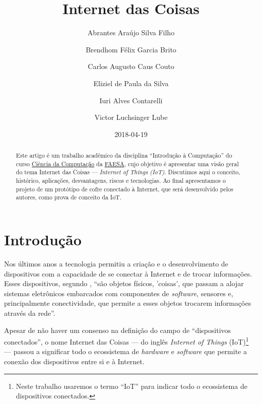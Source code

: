 \documentclass[pdftex, brazil, 12pt, twoside]{article}
\newcommand{\ingles}[1]{\textit{#1}}
\begin{document}
\title{Internet das Coisas}
\author{Abrantes Araújo Silva Filho \and Brendhom Félix Garcia Brito
  \and Carlos Augusto Caus Couto \and Eliziel de Paula da Silva \and Iuri Alves Contarelli
  \and Victor Luchsinger Lube}
\date{2018-04-19}
\maketitle
\begin{abstract}
  Este artigo é um trabalho acadêmico da disciplina ``Introdução à Computação'' do
  curso \href{https://www.faesa.br/curso/ciencia-da-computacao/}{Ciência da Computação}
  da \href{https://www.faesa.br/}{FAESA}, cujo objetivo é apresentar uma visão
  geral do tema Internet das Coisas --- \ingles{Internet of Things (IoT)}. Discutimos
  aqui o conceito, histórico, aplicações, desvantagens, riscos e tecnologias. Ao
  final apresentamos o projeto de um protótipo de cofre conectado à Internet, que
  será desenvolvido pelos autores, como prova de conceito da IoT.
\end{abstract}
\tableofcontents


\section{Introdução}
\label{intro}

Nos últimos anos a tecnologia permitiu a criação e o desenvolvimento de dispositivos com a
capacidade de se conectar à Internet e de trocar informações. Esses dispositivos,
segundo \citet{BarbozaTCCIoT2015}, ``são objetos físicos, 'coisas', que passam
a alojar sistemas eletrônicos embarcados com componentes de \ingles{software},
sensores e, principalmente conectividade, que permite a esses objetos trocarem
informações através da rede''.

Apesar de não haver um consenso na definição do campo de ``dispositivos conectados'',
o nome Internet das Coisas --- do inglês \ingles{Internet of Things} (IoT)\footnote{Neste trabalho
  usaremos o termo ``IoT'' para indicar todo o ecossistema de dispositivos conectados.} --- passou
a significar todo o ecossistema de \ingles{hardware} e \ingles{software} que
permite a conexão dos dispositivos entre si e à Internet.


\end{document}
